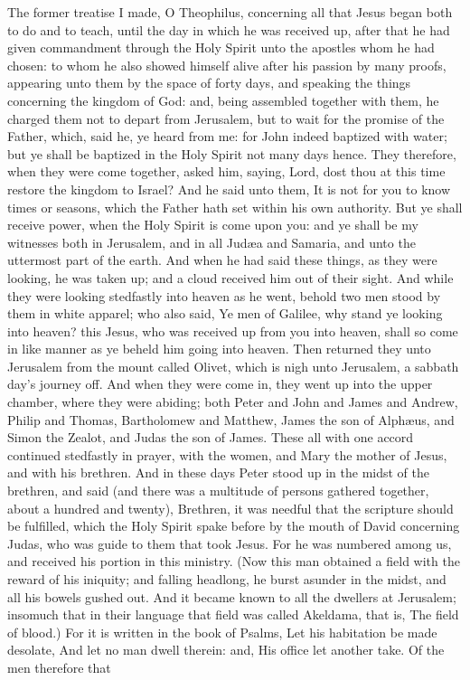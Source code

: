 


The former treatise I made, O Theophilus, concerning all that Jesus began both to do and to teach, until the day in which he was received up, after that he had given commandment through the Holy Spirit unto the apostles whom he had chosen: to whom he also showed himself alive after his passion by many proofs, appearing unto them by the space of forty days, and speaking the things concerning the kingdom of God: and, being assembled together with them, he charged them not to depart from Jerusalem, but to wait for the promise of the Father, which, said he, ye heard from me: for John indeed baptized with water; but ye shall be baptized in the Holy Spirit not many days hence.  They therefore, when they were come together, asked him, saying, Lord, dost thou at this time restore the kingdom to Israel? And he said unto them, It is not for you to know times or seasons, which the Father hath set within his own authority. But ye shall receive power, when the Holy Spirit is come upon you: and ye shall be my witnesses both in Jerusalem, and in all Judæa and Samaria, and unto the uttermost part of the earth. And when he had said these things, as they were looking, he was taken up; and a cloud received him out of their sight. And while they were looking stedfastly into heaven as he went, behold two men stood by them in white apparel; who also said, Ye men of Galilee, why stand ye looking into heaven? this Jesus, who was received up from you into heaven, shall so come in like manner as ye beheld him going into heaven.  Then returned they unto Jerusalem from the mount called Olivet, which is nigh unto Jerusalem, a sabbath day’s journey off. And when they were come in, they went up into the upper chamber, where they were abiding; both Peter and John and James and Andrew, Philip and Thomas, Bartholomew and Matthew, James the son of Alphæus, and Simon the Zealot, and Judas the son of James. These all with one accord continued stedfastly in prayer, with the women, and Mary the mother of Jesus, and with his brethren.  And in these days Peter stood up in the midst of the brethren, and said (and there was a multitude of persons gathered together, about a hundred and twenty), Brethren, it was needful that the scripture should be fulfilled, which the Holy Spirit spake before by the mouth of David concerning Judas, who was guide to them that took Jesus. For he was numbered among us, and received his portion in this ministry. (Now this man obtained a field with the reward of his iniquity; and falling headlong, he burst asunder in the midst, and all his bowels gushed out. And it became known to all the dwellers at Jerusalem; insomuch that in their language that field was called Akeldama, that is, The field of blood.) For it is written in the book of Psalms, Let his habitation be made desolate, And let no man dwell therein: and, His office let another take.  Of the men therefore that 